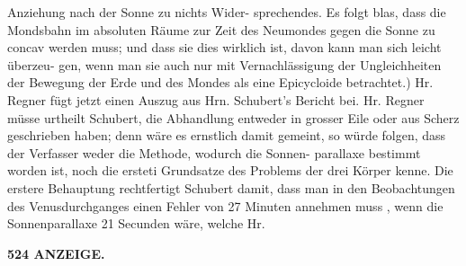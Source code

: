 \documentclass[12pt,a4paper]{article}
\begin{document}
Anziehung  nach  der  Sonne  zu  nichts  Wider- sprechendes. Es  folgt  blas,  dass  die  Mondsbahn  im  absoluten  Räume  zur  Zeit  des  Neumondes  gegen die  Sonne  zu  concav  werden  muss;  und  dass  sie  dies  wirklich  ist,  davon  kann  man  sich  leicht  überzeu- gen, wenn  man  sie  auch  nur  mit  Vernachlässigung  der  Ungleichheiten  der  Bewegung  der  Erde  und  des Mondes  als  eine  Epicycloide  betrachtet.) Hr.  Regner  fügt  jetzt  einen  Auszug  aus  Hrn.  Schubert's  Bericht  bei.  Hr.  Regner  müsse  urtheilt Schubert,  die  Abhandlung  entweder  in  grosser  Eile  oder  aus  Scherz  geschrieben  haben;  denn  wäre  es ernstlich  damit  gemeint,  so  würde  folgen,  dass  der  Verfasser  weder  die  Methode,  wodurch  die  Sonnen- parallaxe bestimmt  worden  ist,  noch  die  ersteti  Grundsatze  des  Problems  der  drei  Körper  kenne.  Die erstere  Behauptung  rechtfertigt  Schubert  damit,  dass  man  in  den  Beobachtungen  des  Venusdurchganges einen  Fehler  von  27  Minuten  annehmen  muss ,  wenn  die  Sonnenparallaxe  21  Secunden  wäre,  welche  Hr.

\vspace{0.5em}


\noindent\textbf{524  ANZEIGE.}
\end{document}

